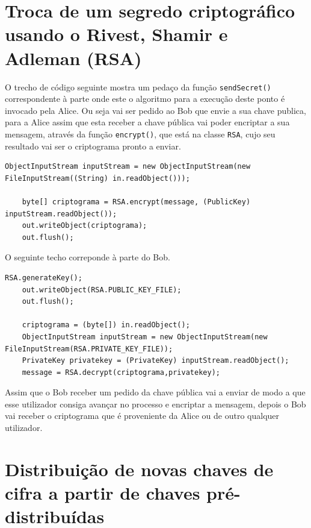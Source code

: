 \newline\section{Troca de um segredo criptográfico usando o Rivest, Shamir e Adleman (RSA)}
\label{chap4:sec:rsa}

O trecho de código seguinte mostra um pedaço da função \texttt{sendSecret()} correspondente à parte onde este o algoritmo para a execução deste ponto é invocado pela Alice. Ou seja vai ser pedido ao Bob que envie a sua chave publica, para a Alice assim que esta receber a chave pública vai poder encriptar a sua mensagem, através da função \texttt{encrypt()}, que está na classe \texttt{RSA}, cujo seu resultado vai ser o criptograma pronto a enviar.

\begin{lstlisting}[caption=Trecho de código usado no projeto.]
    ObjectInputStream inputStream = new ObjectInputStream(new FileInputStream((String) in.readObject()));
              
    byte[] criptograma = RSA.encrypt(message, (PublicKey) inputStream.readObject());
    out.writeObject(criptograma);
    out.flush();
\end{lstlisting}
O seguinte techo correponde à parte do Bob.
\begin{lstlisting}[caption=Trecho de código usado no projeto.]
    RSA.generateKey();
    out.writeObject(RSA.PUBLIC_KEY_FILE);
    out.flush();
    
    criptograma = (byte[]) in.readObject();
    ObjectInputStream inputStream = new ObjectInputStream(new FileInputStream(RSA.PRIVATE_KEY_FILE));
    PrivateKey privatekey = (PrivateKey) inputStream.readObject();
    message = RSA.decrypt(criptograma,privatekey);
\end{lstlisting}

Assim que o Bob receber um pedido da chave pública vai a enviar de modo a que esse utilizador consiga avançar no processo e encriptar a mensagem, depois o Bob vai receber o criptograma que é proveniente da Alice ou de outro qualquer utilizador.

\section{Distribuição de novas chaves de cifra a partir de chaves pré-distribuídas}
\label{chap4:sec:predistribuidas}

